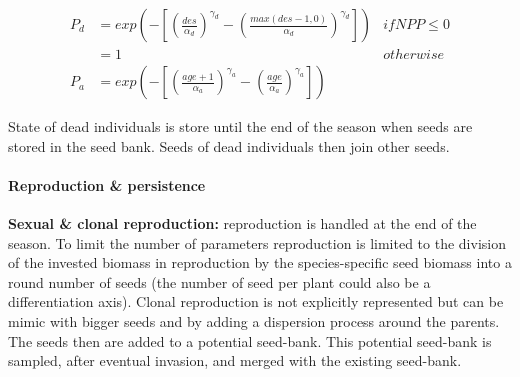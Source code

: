 \begin{align}
P_{d} &=  exp \left( - \left[\left(\frac{des}{\alpha_{d}}\right)^{\gamma_{d}} - \left(\frac{max(des - 1, 0)}{\alpha_{d}}\right)^{\gamma_{d}}\right]\right) & if NPP \le 0\\
&= 1 & otherwise\\
P_{a} &= exp \left( - \left[\left(\frac{age + 1}{\alpha_{a}}\right)^{\gamma_{a}} - \left(\frac{age}{\alpha_{a}}\right)^{\gamma_{a}}\right]\right)
\end{align}

State of dead individuals is store until the end of the season when seeds are stored in the seed bank. Seeds of dead individuals then join other seeds.

\paragraph{Reproduction \& persistence}
\textbf{Sexual \& clonal reproduction:} reproduction is handled at the end of the season. To limit the number of parameters reproduction is limited to the division of the invested biomass in reproduction by the species-specific seed biomass into a round number of seeds (the number of seed per plant could also be a differentiation axis). Clonal reproduction is not explicitly represented but can be mimic with bigger seeds and by adding a dispersion process around the parents. The seeds then are added to a potential seed-bank. This potential seed-bank is sampled, after eventual invasion, and merged with the existing seed-bank.\\

